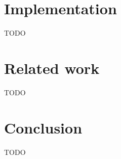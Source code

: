 \documentclass[11pt]{article}
\begin{document}
    \section{Implementation}

    TODO %


    \section{Related work}

    TODO %


    \section{Conclusion}

    TODO %

    
    
\end{document}
